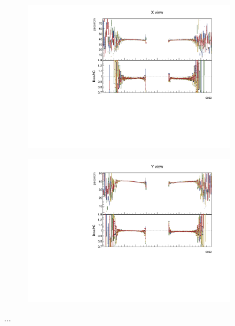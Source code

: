 \documentclass[12pt,a4paper]{article}
\begin{document}
\begin{figure}[!ht]
\begin{subfigure}{0.5\textwidth}
  \end{subfigure}
  \begin{subfigure}{0.5\textwidth}
    \includegraphics[width=\linewidth]{PlotsAngularDistribution/pecorrcm_cosz_x.pdf}
  \end{subfigure}
  \begin{subfigure}{0.5\textwidth}
    \includegraphics[width=\linewidth]{PlotsAngularDistribution/pecorrcm_cosz_y.pdf}
  \end{subfigure}
  \caption{...}
  \label{figAbsCalibCosZ1}
\end{figure}
\end{document}
